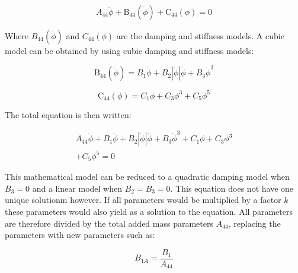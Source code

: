             
    
    \begin{equation}
A_{44} \ddot{\phi} + \operatorname{B_{44}}\left(\dot{\phi}\right) + \operatorname{C_{44}}\left(\phi\right) = 0
\label{eq:equation}
\end{equation}

    

    Where \(B_{44}(\dot{\phi})\) and \(C_{44}(\phi)\) are the damping and
stiffness models. A cubic model can be obtained by using cubic damping
and stiffness models:
 
            
    
    \begin{equation}
\operatorname{B_{44}}\left(\dot{\phi}\right) = B_{1} \dot{\phi} + B_{2} \left|{\dot{\phi}}\right| \dot{\phi} + B_{3} \dot{\phi}^{3}
\label{eq:equation}
\end{equation}

    
 
            
    
    \begin{equation}
\operatorname{C_{44}}\left(\phi\right) = C_{1} \phi + C_{3} \phi^{3} + C_{5} \phi^{5}
\label{eq:equation}
\end{equation}

    

    The total equation is then written:
 
            
    
    \begin{equation}
\begin{aligned}
A_{44} \ddot{\phi} + B_{1} \dot{\phi} + B_{2} \left|{\dot{\phi}}\right| \dot{\phi} + B_{3} \dot{\phi}^{3} + C_{1} \phi + C_{3} \phi^{3} \\ + C_{5} \phi^{5} = 0
\end{aligned}
\label{eq:equation}
\end{equation}

    

    This mathematical model can be reduced to a quadratic damping model when
\(B_3=0\) and a linear model when \(B_2=B_3=0\). This equation does not
have one unique solutionm however. If all parameters would be multiplied
by a factor \(k\) these parameters would also yield as a solution to the
equation. All parameters are therefore divided by the total added mass
parameters \(A_{44}\), replacing the parameters with new parameters such
as:
 
            
    
    \begin{equation}
B_{1A} = \frac{B_{1}}{A_{44}}
\label{eq:equation}
\end{equation}

